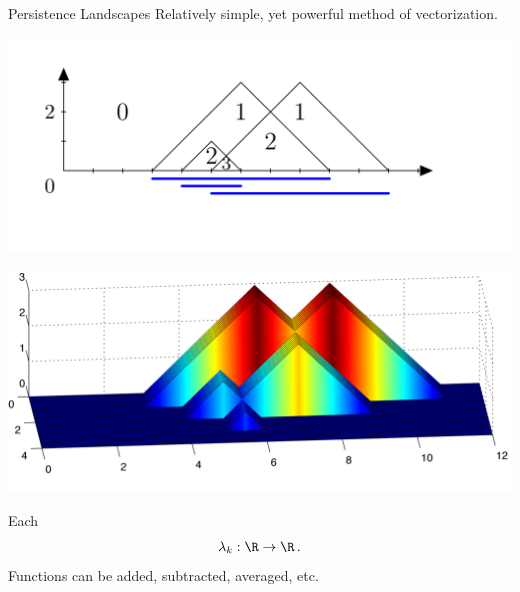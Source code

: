 \documentclass[usenames,dvipsnames,aspectratio=1610]{beamer}
\begin{document}
\begin{frame}{Persistence Landscapes}
  Relatively simple, yet powerful method of vectorization.
  \begin{minipage}{\textwidth}
    \begin{minipage}{0.7\textwidth}
      \begin{center}
	\includegraphics[scale=0.3]{l1.png}

	\includegraphics[scale=0.3]{l3.png}
      \end{center}
    \end{minipage}
    \begin{minipage}{0.25\textwidth}
      Each 
      \[
	\lambda_k: \R \to \R \, .
      \] 
      Functions can be added, subtracted, averaged, etc.

    \end{minipage}
  \end{minipage}
\end{frame}
\end{document}
